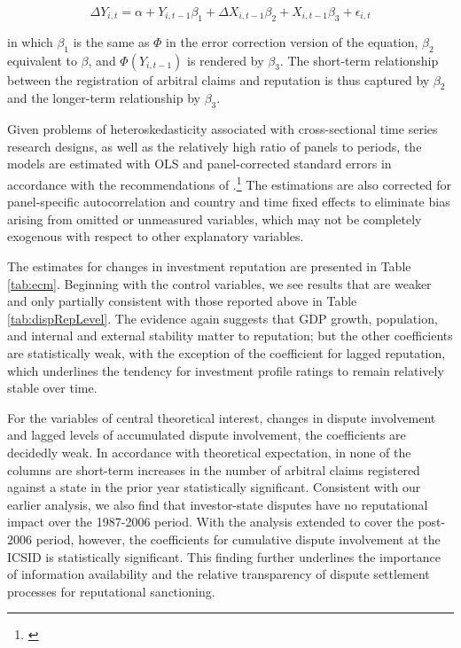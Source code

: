 \documentclass[12pt,onesided]{amsart}
\begin{document}
\begin{equation}
\Delta Y_{i,t} = \alpha + Y_{i,t-1} \beta_{1} + \Delta X_{i,t-1} \beta_{2} + X_{i, t-1} \beta_{3} + \epsilon_{i,t}
\end{equation}

in which $\beta_{1}$ is the same as $\Phi$ in the error correction version of the equation, $\beta_{2}$ equivalent to $\beta$, and $\Phi(Y_{i,t-1})$ is rendered by $\beta_{3}$. The short-term relationship between the registration of arbitral claims and reputation is thus captured by $\beta_{2}$  and the longer-term relationship by $\beta_{3}$.

Given problems of heteroskedasticity associated with cross-sectional time series research designs, as well as the relatively high ratio of panels to periods, the models are estimated with OLS and panel-corrected standard errors in accordance with the recommendations of \citeauthor{beck:katz:1995}.\footnote{\citet{beck:katz:1995}} The estimations are also corrected for panel-specific autocorrelation and country and time fixed effects to eliminate bias arising from omitted or unmeasured variables, which may not be completely exogenous with respect to other explanatory variables.

The estimates for changes in investment reputation are presented in Table \ref{tab:ecm}. Beginning with the control variables, we see results that are weaker and only partially consistent with those reported above in Table \ref{tab:dispRepLevel}. The evidence again suggests that GDP growth, population, and internal and external stability matter to reputation; but the other coefficients are statistically weak, with the exception of the coefficient for lagged reputation, which underlines the tendency for investment profile ratings to remain relatively stable over time. 

For the variables of central theoretical interest, changes in dispute involvement and lagged levels of accumulated dispute involvement, the coefficients are decidedly weak. In accordance with theoretical expectation, in none of the columns are short-term increases in the number of arbitral claims registered against a state in the prior year statistically significant. Consistent with our earlier analysis, we also find that investor-state disputes have no reputational impact over the 1987-2006 period. With the analysis extended to cover the post-2006 period, however, the coefficients for cumulative dispute involvement at the ICSID is statistically significant. This finding further underlines the importance of information availability and the relative transparency of dispute settlement processes for reputational sanctioning. 
\end{document}
